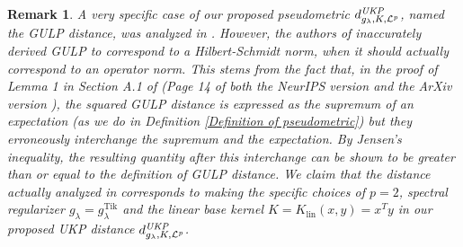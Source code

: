\documentclass{article} %
\newcommand{\gl}{g_{\lambda}}
\newcommand{\glTik}{\gl^{\operatorname{Tik}}}
\newcommand{\metricstname}{UKP }
\newcommand{\dLpgl}{d_{\gl,K,\mathcal{L}^{p}}^{\emph{\metricstname}}}
\theoremstyle{plain}
\newcounter{remarkno}
\newtheorem{remark}[remarkno]{Remark}
\begin{document}
\begin{remark}
    A very specific case of our proposed pseudometric $\dLpgl$, named the GULP distance, was analyzed in \citet{GULP}. However, the authors of \cite{GULP} inaccurately derived GULP to correspond to a Hilbert-Schmidt norm, when it should actually correspond to an operator norm. This stems from the fact that, in the proof of Lemma 1 in Section A.1 of \citet{GULP} (Page 14 of both the NeurIPS version \citet{GULP} and the ArXiv version \citet{}), the squared GULP distance is expressed as the supremum of an expectation (as we do in Definition \ref{Definition of pseudometric}) but they erroneously interchange the supremum and the expectation. By Jensen's inequality, the resulting quantity after this interchange can be shown to be greater than or equal to the definition of GULP distance. We claim that the distance actually analyzed in \citet{GULP} corresponds to making the specific choices of $p=2$, spectral regularizer $\gl = \glTik$ and the linear base kernel $K = K_{\operatorname{lin}}(x,y) = x^{T}y$ in our proposed \metricstname distance $\dLpgl$.
\end{remark}
\end{document}
